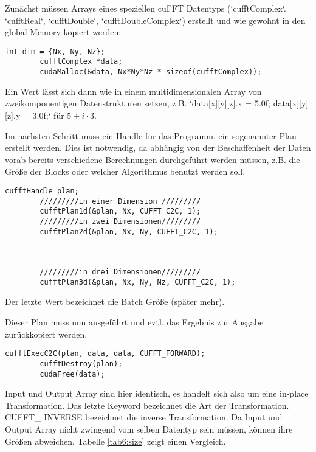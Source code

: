 		Zunächst müssen Arrays eines speziellen cuFFT Datentyps (\li`cufftComplex`. \li`cufftReal`, \li`cufftDouble`, \li`cufftDoubleComplex`) erstellt und wie gewohnt in den \gls{global Memory} kopiert werden:
		
		\begin{lstlisting}[caption=cuFFT: komplexer Datentyp]
		int dim = {Nx, Ny, Nz};
		cufftComplex *data;
		cudaMalloc(&data, Nx*Ny*Nz * sizeof(cufftComplex));
		\end{lstlisting}
		
		Ein Wert lässt sich dann wie in einem multidimensionalen Array von zweikomponentigen Datenstrukturen setzen, z.B. \li`data[x][y][z].x = 5.0f; data[x][y][z].y = 3.0f;` für $5 + i\cdot 3$.
	
		Im nächsten Schritt muss ein \Gls{Handle} für das Programm, ein sogenannter Plan erstellt werden. Dies ist notwendig, da abhängig von der Beschaffenheit der Daten vorab bereits verschiedene Berechnungen durchgeführt werden müssen, z.B. die Größe der \Glspl{Block} oder welcher Algorithmus benutzt werden soll. 
		
		\begin{lstlisting}[caption=cuFFT: Pläne]
		cufftHandle plan;
		/////////in einer Dimension /////////
		cufftPlan1d(&plan, Nx, CUFFT_C2C, 1);	
		/////////in zwei Dimensionen/////////
		cufftPlan2d(&plan, Nx, Ny, CUFFT_C2C, 1);	
		
		
				
		/////////in drei Dimensionen/////////
		cufftPlan3d(&plan, Nx, Ny, Nz, CUFFT_C2C, 1);
		\end{lstlisting}
		
		Der letzte Wert bezeichnet die Batch Größe (später mehr).
	
		Dieser Plan muss nun ausgeführt und evtl. das Ergebnis zur Ausgabe zurückkopiert werden.
		
		\begin{lstlisting}[caption=cuFFT: Ausführen]
		cufftExecC2C(plan, data, data, CUFFT_FORWARD);
		cufftDestroy(plan);
		cudaFree(data);
		\end{lstlisting}
		
		Input und Output Array sind hier identisch, es handelt sich also um eine in-place Transformation. Das letzte Keyword bezeichnet die Art der Transformation. CUFFT\_ INVERSE bezeichnet die inverse Transformation. Da Input und Output Array nicht zwingend vom selben Datentyp sein müssen, können ihre Größen abweichen. Tabelle \ref{tab6:size} zeigt einen Vergleich.
		
